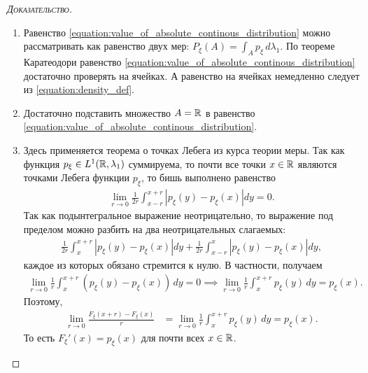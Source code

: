 \documentclass[../main.tex]{subfiles}
\begin{document}
\begin{proof}[\normalfont\textsc{Доказательство}]\
 \begin{enumerate}
  \item Равенство \eqref{equation:value_of_absolute_continous_distribution} можно рассматривать как равенство двух мер: $ P_\xi(A) = \int_{A} p_\xi \, d\lambda_1  $. По теореме Каратеодори равенство \eqref{equation:value_of_absolute_continous_distribution} достаточно проверять на ячейках. А равенство на ячейках немедленно следует из \eqref{equation:density_def}.
  \item Достаточно подставить множество $ A = \mathbb{R} $ в равенство \eqref{equation:value_of_absolute_continous_distribution}.
  \item Здесь применяется теорема о точках Лебега из курса теории меры. Так как функция $ p_\xi \in L^{1}(\mathbb{R}, \lambda_1)$  суммируема, то почти все точки $ x \in \mathbb{R} $ являются точками Лебега функции  $ p_\xi $, то бишь выполнено равенство
   \begin{align*}
    \lim_{r \to 0} \frac{1}{2r} \int_{x-r}^{x+r} \left| p_\xi(y) - p_\xi(x) \right|dy = 0.
   \end{align*} Так как подынтегральное выражение неотрицательно, то выражение под пределом можно разбить на два неотрицательных слагаемых:
   \begin{align*}
    \frac{1}{2r}\int_{x}^{x+r} \left| p_\xi(y)-p_\xi(x) \right|dy + \frac{1}{2r} \int_{x-r}^{x} \left| p_\xi(y)-p_\xi(x) \right|dy,
   \end{align*} каждое из которых обязано стремится к нулю. В частности, получаем
   \begin{align*}
    \lim_{r \to 0} \frac{1}{r} \int_{x}^{x+r} ( p_\xi(y) - p_\xi(x) )\,dy = 0 \implies \lim_{r \to 0} \frac{1}{r}\int_{x}^{x+r} p_\xi(y)\,dy = p_\xi(x).
   \end{align*} Поэтому,
   \begin{align*}
    \lim_{r \to 0} \frac{F_\xi(x + r) - F_\xi(x)}{r} &= \lim_{r \to 0} \frac{1}{r} \int_{x}^{x+r} p_\xi(y)\,dy = p_\xi(x).
   \end{align*} То есть $ F_\xi'(x) = p_\xi(x) $ для почти всех $ x\in\mathbb{R} $.
 \end{enumerate}
\end{proof}
\end{document}
